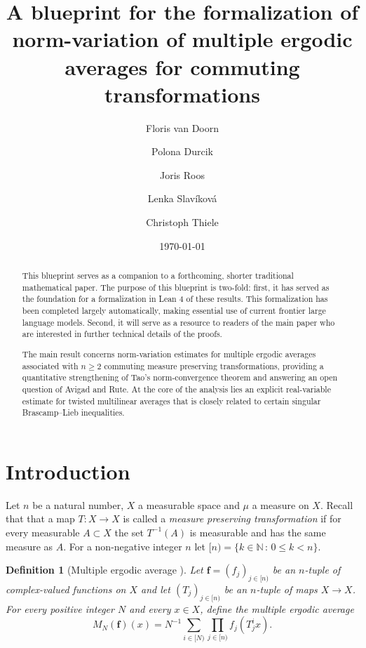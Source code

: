\documentclass[12pt,reqno]{amsart}
\title[Norm-variation of multiple ergodic averages]{A blueprint for the formalization of norm-variation of multiple ergodic averages for commuting transformations}
\author[van Doorn]{Floris van Doorn}
\author[Durcik]{Polona Durcik}
\author[Roos]{Joris Roos}
\author[Slav\'ikov\'a]{Lenka Slav\'ikov\'a}
\author[Thiele]{Christoph Thiele}
\date{\today}
\theoremstyle{plain}
\newtheorem{definition}[theorem]{Definition}
\numberwithin{equation}{section}
\theoremstyle{remark}
\newcommand{\uses}[1]{}
\newcommand{\usesdefs}[1]{}
\newcommand{\lean}[1]{}
\DeclareRobustCommand{\leanlink}[1]{%
    \href
    {https://pjroos.com/lean-nct/docs/find/?pattern=#1\&strict=false\#doc}
    {\ensuremath{\forall}}
}
\newcommand{\N}{{\mathbb N}}
\begin{document}

\begin{abstract}
This blueprint serves as a companion to a forthcoming, shorter traditional mathematical paper. The purpose of this blueprint is two-fold: first, it has served as the foundation for a formalization in Lean 4 of these results. This formalization has been completed largely automatically, making essential use of current frontier large language models. Second, it will serve as a resource to readers of the main paper who are interested in further technical details of the proofs.

The main result concerns norm-variation estimates for multiple ergodic averages associated with $n\ge 2$ commuting measure preserving transformations, providing a quantitative strengthening of Tao's norm-convergence theorem and answering an open question of Avigad and Rute. At the core of the analysis lies an explicit real-variable estimate for twisted multilinear averages that is closely related to certain singular Brascamp--Lieb inequalities.   \end{abstract}

\maketitle

\section{Introduction}

Let $n$ be a natural number, $X$ a measurable space and $\mu$ a measure on $X$. 
Recall that that a map $T: X \to X$ is called a {\em measure preserving transformation} if for every measurable $A\subset X$ the set $T^{-1}(A)$ is measurable and has the
same measure as $A$. For a non-negative integer $n$ let $[n)=\{k\in \N\,:\,0\le k<n\}$.

\begin{definition}[Multiple ergodic average \leanlink{nCT.multipleErgodicAverage}]\label{ergodic averages}\lean{nCT.multipleErgodicAverage}\uses{}\usesdefs{}
Let $\mathbf{f}=(f_j)_{j\in [n)}$ be an $n$-tuple of complex-valued functions on $X$ and let $(T_j)_{j\in [n)}$ be an $n$-tuple of maps $X\to X$. For every positive integer $N$ and every $x\in X$, define the multiple ergodic average
\begin{equation}\label{eq:averages-multiple}
M_{N}(\mathbf{f})(x) = N^{-1} \sum_{i \in [N)} \prod_{j \in [n)} f_j(T_j^i x).
\end{equation}
\end{definition}
\end{document}
